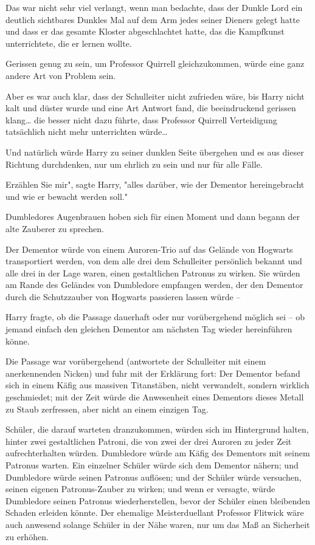 {Das war nicht sehr viel verlangt, wenn man bedachte, dass der Dunkle Lord ein deutlich sichtbares Dunkles Mal auf dem Arm jedes seiner Dieners gelegt hatte und dass er das gesamte Kloster abgeschlachtet hatte, das die Kampfkunst unterrichtete, die er lernen wollte.

Gerissen genug zu sein, um Professor Quirrell gleichzukommen, würde eine ganz andere Art von Problem sein.

Aber es war auch klar, dass der Schulleiter nicht zufrieden wäre, bis Harry nicht kalt und düster wurde und eine Art Antwort fand, die beeindruckend gerissen klang… die besser nicht dazu führte, dass Professor Quirrell Verteidigung tatsächlich nicht mehr unterrichten würde…

Und natürlich würde Harry zu seiner dunklen Seite übergehen und es aus dieser Richtung durchdenken, nur um ehrlich zu sein und nur für alle Fälle.

Erzählen Sie mir", sagte Harry, "alles darüber, wie der Dementor hereingebracht und wie er bewacht werden soll."

Dumbledores Augenbrauen hoben sich für einen Moment und dann begann der alte Zauberer zu sprechen.

Der Dementor würde von einem Auroren-Trio auf das Gelände von Hogwarts transportiert werden, von dem alle drei dem Schulleiter persönlich bekannt und alle drei in der Lage waren, einen gestaltlichen Patronus zu wirken. Sie würden am Rande des Geländes von Dumbledore empfangen werden, der den Dementor durch die Schutzzauber von Hogwarts passieren lassen würde --

Harry fragte, ob die Passage dauerhaft oder nur vorübergehend möglich sei -- ob jemand einfach den gleichen Dementor am nächsten Tag wieder hereinführen könne.

Die Passage war vorübergehend (antwortete der Schulleiter mit einem anerkennenden Nicken) und fuhr mit der Erklärung fort: Der Dementor befand sich in einem Käfig aus massiven Titanstäben, nicht verwandelt, sondern wirklich geschmiedet; mit der Zeit würde die Anwesenheit eines Dementors dieses Metall zu Staub zerfressen, aber nicht an einem einzigen Tag.

Schüler, die darauf warteten dranzukommen, würden sich im Hintergrund halten, hinter zwei gestaltlichen Patroni, die von zwei der drei Auroren zu jeder Zeit aufrechterhalten würden. Dumbledore würde am Käfig des Dementors mit seinem Patronus warten. Ein einzelner Schüler würde sich dem Dementor nähern; und Dumbledore würde seinen Patronus auflösen; und der Schüler würde versuchen, seinen eigenen Patronus-Zauber zu wirken; und wenn er versagte, würde Dumbledore seinen Patronus wiederherstellen, bevor der Schüler einen bleibenden Schaden erleiden könnte. Der ehemalige Meisterduellant Professor Flitwick wäre auch anwesend solange Schüler in der Nähe waren, nur um das Maß an Sicherheit zu erhöhen.

}
